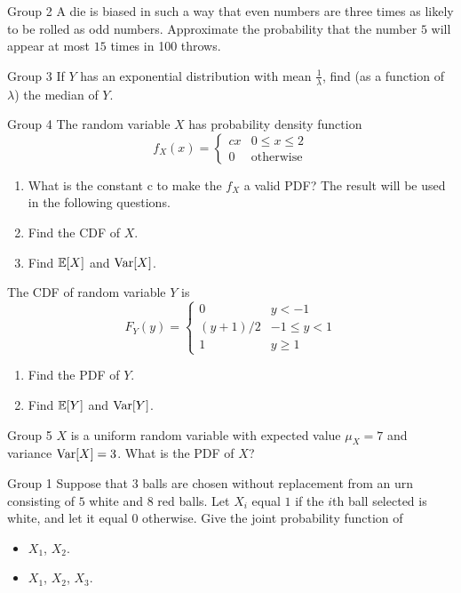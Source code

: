 \documentclass{article}
\begin{document}
\begin{problem}
    {Group 2}
    A die is biased in such a way that even numbers are three times as likely to be rolled as odd numbers. Approximate the probability that the number $5$ will appear at most $15$ times in 100 throws.
\end{problem}

\begin{problem}
    {Group 3}
    If $Y$ has an exponential distribution with mean $\frac{1}{\lambda}$, find (as a function of $\lambda$) the median of $Y$.
\end{problem}

\begin{problem}
    {Group 4}
    The random variable $X$ has probability density function
    \[f_X(x)={
        \begin{cases}
            cx & 0\leq x\leq 2\\
            0  & \text{otherwise}
        \end{cases}
    }\]
    \begin{enumerate}
        \item What is the constant c to make the $f_X$ a valid PDF? The result will be used in the following questions.
        \item Find the CDF of $X$.
        \item Find $\E{X}$ and $\mathop{\mathrm{Var}}\nolimits[X]$.
    \end{enumerate}
    The CDF of random variable $Y$ is
    \[F_Y(y)={
        \begin{cases}
            0 & y<-1\\
            (y+1)/2 & -1\leq y<1\\
            1 & y\geq 1
        \end{cases}
    }\]
    \begin{enumerate}
        \item Find the PDF of $Y$.
        \item Find $\E{Y}$ and $\mathop{\mathrm{Var}}\nolimits[Y]$.
    \end{enumerate}
\end{problem}

\begin{problem}
    {Group 5}
    $X$ is a uniform random variable with expected value $\mu_X = 7$ and variance $\mathop{\mathrm{Var}}\nolimits[X] = 3$. What is the PDF of $X$?
\end{problem}
\fi
\iffalse
\begin{problem}
    {Group 1}
    Suppose that $3$ balls are chosen without replacement from an urn consisting of $5$ white and $8$ red balls. Let $X_i$ equal $1$ if the $i$th ball selected is white, and let it equal $0$ otherwise. Give the joint probability function of
    \begin{itemize}
        \item $X_1$, $X_2$.
        \item $X_1$, $X_2$, $X_3$.
    \end{itemize}
\end{problem}
\end{document}

